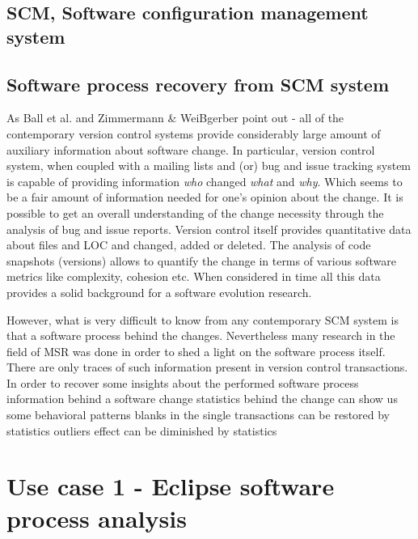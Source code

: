 

\section{SCM, Software configuration management system}

\section{Software process recovery from SCM system}
As Ball et al. \cite{citeulike:9004378} and Zimmermann \& WeiBgerber \cite{citeulike:5058462} point out - all of the contemporary version control systems provide considerably large amount of auxiliary information about software change. In particular, version control system, when coupled with a mailing lists and (or) bug and issue tracking system is capable of providing information \textit{who} changed \textit{what} and \textit{why}. Which seems to be a fair amount of information needed for one's opinion about the change. It is possible to get an overall understanding of the change necessity through the analysis of bug and issue reports. Version control itself provides quantitative data about files and LOC and changed, added or deleted. The analysis of code snapshots (versions) allows to quantify the change in terms of various software metrics like complexity, cohesion etc. When considered in time all this data provides a solid background for a software evolution research.

However, what is very difficult to know from any contemporary SCM system is that a software process behind the changes. Nevertheless many research in the field of MSR was done in order to shed a light on the software process itself. \cite{citeulike:9007622} There are only traces of such information present in version control transactions. In order to recover some insights about the performed software process information behind a software change statistics behind the change can show us some behavioral patterns blanks in the single transactions can be restored by statistics
outliers effect can be diminished by statistics

\chapter{Use case 1 - Eclipse software process analysis}